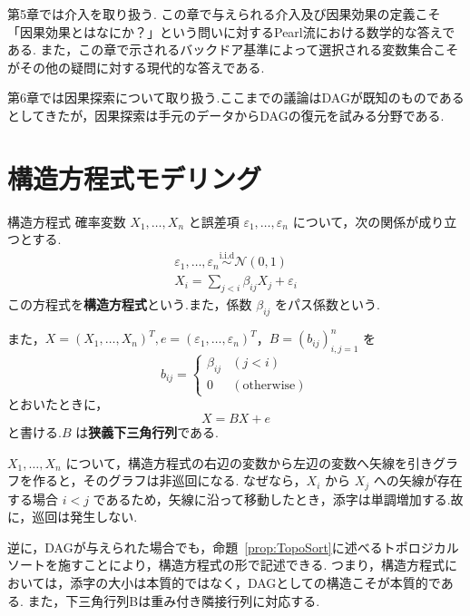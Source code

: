 \documentclass[uplatex, dvipdfmx]{jsarticle}
\begin{document}
第5章では介入を取り扱う.
この章で与えられる介入及び因果効果の定義こそ「因果効果とはなにか？」という問いに対するPearl流における数学的な答えである.
また，この章で示されるバックドア基準によって選択される変数集合こそがその他の疑問に対する現代的な答えである.

第6章では因果探索について取り扱う.ここまでの議論はDAGが既知のものであるとしてきたが，因果探索は手元のデータからDAGの復元を試みる分野である.

\newpage

\section{構造方程式モデリング}

\begin{defn}{構造方程式}
  確率変数 $X_1, \dots, X_n$ と誤差項 $\varepsilon_1, \dots, \varepsilon_n$ について，次の関係が成り立つとする.
  \begin{align}
    \varepsilon_1, \dots, \varepsilon_n \overset{\text{i.i.d}}{\sim} \mathcal{N}(0, 1) \\
    X_i = \sum_{j < i} \beta_{ij} X_j + \varepsilon_i
  \end{align}
  この方程式を\textbf{構造方程式}という.また，係数 $\beta_{ij}$ をパス係数という.

また，$X = (X_1, \dots, X_n)^T, e = (\varepsilon_1, \dots, \varepsilon_n)^T$，$B = (b_{ij})_{i,j=1}^n$ を
\[
  b_{ij} = 
  \begin{cases} 
  \beta_{ij} & (j < i) \\
  0 & (\text{otherwise}) 
  \end{cases}
\]
とおいたときに，
\[
  X = BX + e
\]
と書ける.$B$ は\textbf{狭義下三角行列}である.
\end{defn}

$X_1, \dots, X_n$ について，構造方程式の右辺の変数から左辺の変数へ矢線を引きグラフを作ると，そのグラフは非巡回になる.
なぜなら，$X_i$ から $X_j$ への矢線が存在する場合 $i < j$ であるため，矢線に沿って移動したとき，添字は単調増加する.故に，巡回は発生しない.

逆に，DAGが与えられた場合でも，命題~\ref{prop:TopoSort}に述べるトポロジカルソートを施すことにより，構造方程式の形で記述できる.
つまり，構造方程式においては，添字の大小は本質的ではなく，DAGとしての構造こそが本質的である.
また，下三角行列Bは重み付き隣接行列に対応する.
\end{document}
